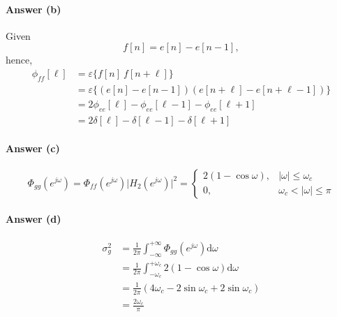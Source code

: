 \begin{q}{}
{\paragraph{Answer (b)} Given
\[
    f[n] = e[n] - e[n-1],
\]
hence,
\begin{align*}
    \phi_{ff}[\ell] 
    & = \varepsilon \{f[n] \ f[n+\ell]\} \\
    & = \varepsilon \{(e[n] - e[n-1])(e[n+\ell] - e[n+\ell-1])\} \\
    & = 2 \phi_{ee}[\ell] - \phi_{ee}[\ell-1] - \phi_{ee}[\ell+1] \\
    & = 2\delta[\ell] - \delta[\ell-1] - \delta[\ell + 1]
\end{align*}

\paragraph{Answer (c)}
\[
    \Phi_{gg}(e^{j\omega}) = \Phi_{ff}(e^{j\omega}) \lvert H_2(e^{j\omega}) \rvert^2 = 
    \begin{cases}
        2(1-\cos\omega), & \lvert \omega \rvert \leq \omega_c \\
        0, & \omega_c < \lvert \omega \rvert \leq \pi
    \end{cases}
\]

\paragraph{Answer (d)}
\begin{align*}
    \sigma_{g}^2
    & = \frac{1}{2\pi} \int_{-\infty}^{+\infty} \Phi_{gg}(e^{j\omega}) \mathrm{d}\omega \\
    & = \frac{1}{2\pi} \int_{-\omega_c}^{+\omega_c} 2(1-\cos\omega) \mathrm{d}\omega \\
    & = \frac{1}{2\pi} (4\omega_c - 2\sin\omega_c + 2\sin\omega_c) \\
    & = \frac{2\omega_c}{\pi}
\end{align*}
}
    
\end{q}
